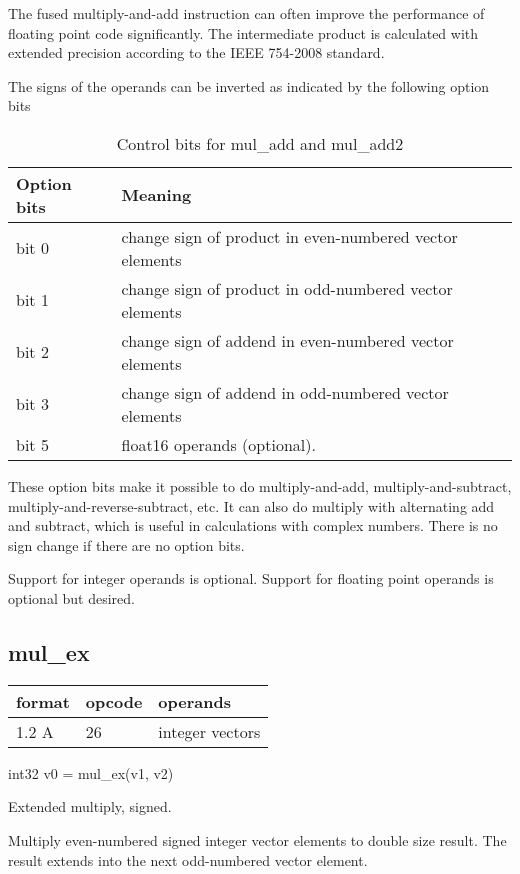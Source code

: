 \documentclass[forwardcom.tex]{subfiles}
\begin{document}
The fused multiply-and-add instruction can often improve the performance of floating point code significantly. The intermediate product is calculated with extended precision according to the IEEE 754-2008 standard.
\vv

The signs of the operands can be inverted as indicated by the following option bits

\begin{longtable} {|p{20mm}|p{75mm}|}
\caption{Control bits for mul\_add and mul\_add2} 
\label{table:ControlBitsForMulAdd} \\
\endfirsthead
\endhead
\hline
\bfseries Option bits &  \bfseries Meaning   \\
\hline
bit 0 & change sign of product in even-numbered vector elements \\
bit 1 & change sign of product in odd-numbered vector elements \\
bit 2 & change sign of addend in even-numbered vector elements \\
bit 3 & change sign of addend in odd-numbered vector elements \\
\hline
bit 5 & float16 operands (optional). \\
\hline
\end{longtable}

\vv
These option bits make it possible to do multiply-and-add, multiply-and-subtract, multiply-and-reverse-subtract, etc. It can also do multiply with alternating add and subtract, which is useful in calculations with complex numbers. 
There is no sign change if there are no option bits. 

\vv
Support for integer operands is optional. Support for floating point operands is optional but desired.
\vv


\subsection{mul\_ex}
\label{table:mulExInstruction}
\begin{tabular}{|p{12mm}|p{15mm}|p{100mm}|}
\hline
\bfseries format & \bfseries opcode & \bfseries operands \\ \hline
1.2 A & 26 & integer vectors \\ \hline
\end{tabular}
\vv

int32 v0 = mul\_ex(v1, v2)
\vv

Extended multiply, signed.
\vv

Multiply even-numbered signed integer vector elements to double size result. The result extends into the next odd-numbered vector element.
\vv
\end{document}
